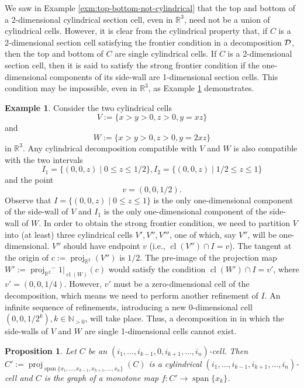 \documentclass[
]{book}
\newtheorem{proposition}{Proposition}[chapter]
\theoremstyle{definition}
\theoremstyle{definition}
\newtheorem{example}{Example}[chapter]
\theoremstyle{definition}
\theoremstyle{definition}
\theoremstyle{remark}
\begin{document}
We saw in Example \ref{exm:top-bottom-not-cylindrical} that the top and bottom of a 2-dimensional cylindrical section cell, even in \(\mathbb{R}^3\), need not be a union of cylindrical cells.
However, it is clear from the cylindrical property that, if \(C\) is a 2-dimensional section cell satisfying the frontier condition in a decomposition \(\cal D\), then the top and bottom of \(C\) are single cylindrical cells.
If \(C\) is a 2-dimensional section cell, then it is said to satisfy the strong frontier condition if the one-dimensional components of its side-wall are 1-dimensional section cells. This condition may be impossible, even in \(\mathbb{R}^3\), as Example \ref{exm:side-wall} demonstrates.

\begin{example}
\protect\hypertarget{exm:side-wall}{}\label{exm:side-wall}Consider the two cylindrical cells
\[
V := \{ x > y > 0, z > 0, y = xz \}
\] and \[
W := \{ x > y > 0, z > 0, y = 2xz \}
\] in \(\mathbb{R}^3\).
Any cylindrical decomposition compatible with \(V\) and \(W\) is also compatible with the two intervals
\[
I_1 = \{ (0,0,z) \mid 0 \le z \le 1/2 \}, I_2 = \{ (0,0,z) \mid 1/2 \le z \le 1 \}
\]
and the point \[v = (0,0,1/2).\]
Observe that \(I = \{ (0,0,z) \mid 0 \le z \le 1 \}\) is the only one-dimensional component of the side-wall of \(V\) and \(I_1\) is the only one-dimensional component of the side-wall of \(W\). In order to obtain the strong frontier condition, we need to partition \(V\) into (at least) three cylindrical cells \(V',V'',V'''\), one of which, say \(V''\), will be one-dimensional. \(V''\) should have endpoint \(v\) (i.e., \({\operatorname{cl} \left( V'' \right)} \cap I = v\)).
The tangent at the origin of \(c := {\operatorname{proj}_{\mathbb{R}^{2}}}(V'')\) is \(1/2\). The pre-image of the projection map \(W' := {\operatorname{proj}_{\mathbb{R}^{2}}}^-1\vert_{{\operatorname{cl} \left( W \right)}}(c)\) would satisfy the condition \({\operatorname{cl} \left( W' \right)} \cap I = v'\), where \(v' = (0,0,1/4)\). However, \(v'\) must be a zero-dimensional cell of the decomposition, which means we need to perform another refinement of \(I\). An infinite sequence of refinements, introducing a new 0-dimensional cell \((0,0,1/2^k), k \in \mathbb{N}_{> 0}\), will take place. Thus, a decomposition in in which the side-walls of \(V\) and \(W\) are single 1-dimensional cells cannot exist.
\end{example}

\begin{proposition}
\protect\hypertarget{prp:delete-zero-index}{}\label{prp:delete-zero-index}\citep[Lemma 3.3]{bgv15}
Let \(C\) be an \((i_1,\ldots,i_{k-1},0,i_{k+1},\ldots,i_n)\)-cell. Then \(C' := {\operatorname{proj}_{{\operatorname{span} \{x_1,\ldots,x_{k-1},x_{k+1},\ldots,x_n\}}}}(C)\) is a cylindrical \((i_1,\ldots,i_{k-1},i_{k+1},\ldots,i_n)\)-cell and \(C\) is the graph of a monotone map \(f : C' \to {\operatorname{span} \{x_k\}}\).
\end{proposition}
\end{document}
